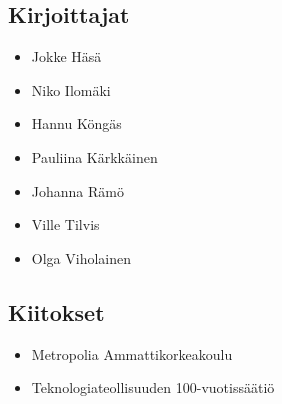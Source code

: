 \subsection*{Kirjoittajat}
\begin{itemize}
\item Jokke Häsä
\item Niko Ilomäki
\item Hannu Köngäs
\item Pauliina Kärkkäinen
\item Johanna Rämö
\item Ville Tilvis
\item Olga Viholainen
\end{itemize}

\subsection*{Kiitokset}
\begin{itemize}
\item Metropolia Ammattikorkeakoulu %
\item Teknologiateollisuuden 100-vuotissäätiö %
\end{itemize}
